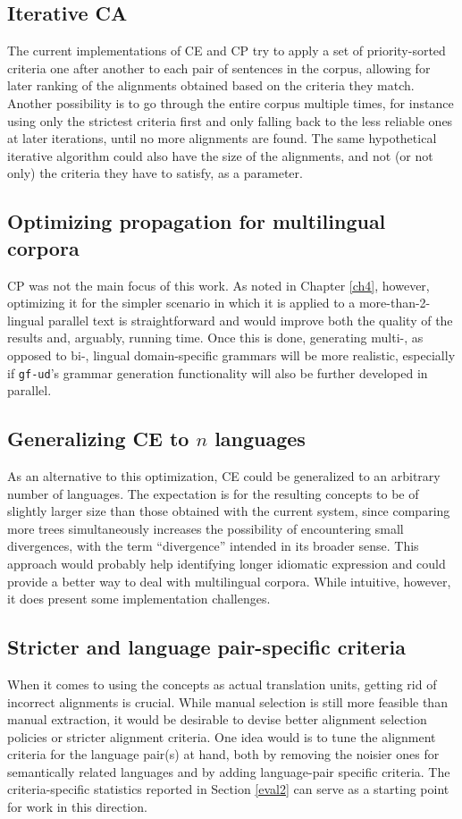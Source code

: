 \subsection*{Iterative CA}
The current implementations of CE and CP try to apply a set of priority-sorted criteria one after another to each pair of sentences in the corpus, allowing for later ranking of the alignments obtained based on the criteria they match. Another possibility is to go through the entire corpus multiple times, for instance using only the strictest criteria first and only falling back to the less reliable ones at later iterations, until no more alignments are found.
The same hypothetical iterative algorithm could also have the size of the alignments, and not (or not only) the criteria they have to satisfy, as a parameter. 

\subsection*{Optimizing propagation for multilingual corpora}
CP was not the main focus of this work. As noted in Chapter \ref{ch4}, however, optimizing it for the simpler scenario in which it is applied to a more-than-2-lingual parallel text is straightforward and would improve both the quality of the results and, arguably, running time. Once this is done, generating multi-, as opposed to bi-, lingual domain-specific grammars will be more realistic, especially if \texttt{gf-ud}'s grammar generation functionality will also be further developed in parallel.

\subsection*{Generalizing CE to $n$ languages}
As an alternative to this optimization, CE could be generalized to an arbitrary number of languages. The expectation is for the resulting concepts to be of slightly larger size than those obtained with the current system, since comparing more trees simultaneously increases the possibility of encountering small divergences, with the term ``divergence'' intended in its broader sense. This approach would probably help identifying longer idiomatic expression and could provide a better way to deal with multilingual corpora. While intuitive, however, it does present some implementation challenges. 

\subsection*{Stricter and language pair-specific criteria} 
When it comes to using the concepts as actual translation units, getting rid of incorrect alignments is crucial. While manual selection is still more feasible than manual extraction, it would be desirable to devise better alignment selection policies or stricter alignment criteria. One idea would is to tune the alignment criteria for the language pair(s) at hand, both by removing the noisier ones for semantically related languages and by adding language-pair specific criteria. The criteria-specific statistics reported in Section \ref{eval2} can serve as a starting point for work in this direction.